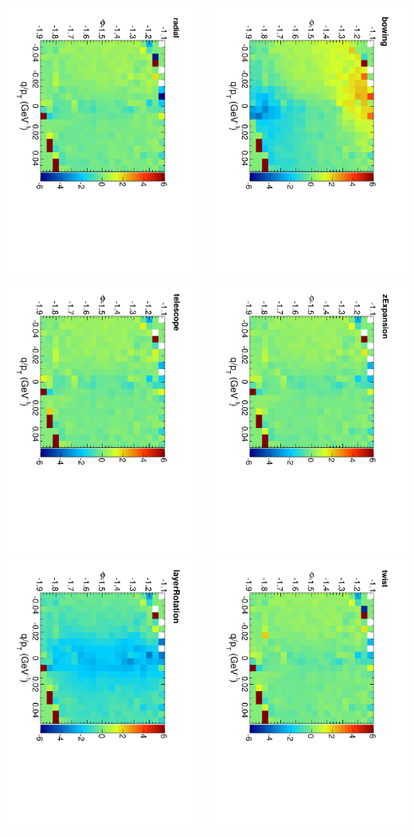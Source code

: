 \documentclass[compress]{beamer}
\begin{document}
\begin{frame}
\begin{columns}
\includegraphics[height=0.32\linewidth, angle=90]{residx-phi-qoverpt_radial.pdf}
\includegraphics[height=0.32\linewidth, angle=90]{residx-phi-qoverpt_telescope.pdf}
\includegraphics[height=0.32\linewidth, angle=90]{residx-phi-qoverpt_layerRotation.pdf}

\includegraphics[height=0.32\linewidth, angle=90]{residx-phi-qoverpt_bowing.pdf}
\includegraphics[height=0.32\linewidth, angle=90]{residx-phi-qoverpt_zExpansion.pdf}
\includegraphics[height=0.32\linewidth, angle=90]{residx-phi-qoverpt_twist.pdf}


\end{columns}
\end{frame}
\end{document}

